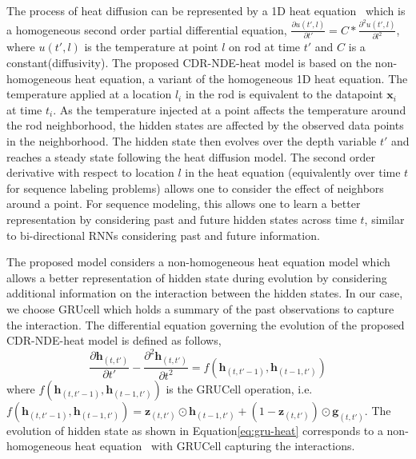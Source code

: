 \documentclass{article} %
\newcommand{\bx}{\mathbf{x}}
\newcommand{\bz}{\mathbf{z}}
\newcommand{\bg}{\mathbf{g}}
\newcommand{\bh}{\mathbf{h}}
\begin{document}
The process of heat diffusion can be represented by a 1D heat equation~\citep{cannon1984one} which is a homogeneous second order partial differential equation,
     $\frac{\partial u(t',l)}{\partial t'} = C* \frac{\partial^{2} u(t',l)}{\partial l^{2}}$,
where $u(t',l)$ is the temperature at point $l$ on rod at time $t'$ and $C$ is a constant(diffusivity). The proposed CDR-NDE-heat model is based on the non-homogeneous heat equation, a variant of the homogeneous 1D heat equation. The temperature applied at a location $l_i$ in the rod is equivalent to the datapoint $\bx_i$ at time $t_i$. As the temperature injected at a point affects the  temperature around the rod neighborhood, the hidden states are affected by the observed data points in the neighborhood.  The hidden state then evolves over the depth variable $t'$ and reaches a steady state following  the heat diffusion model. The second order derivative with respect to location $l$  in the heat equation (equivalently over time $t$ for sequence labeling problems) allows one to consider the effect of neighbors around a point. For sequence modeling, this allows one to learn a  better representation  by considering  past and future hidden states across time $t$, similar to bi-directional RNNs considering past and future information. 


The proposed model considers a non-homogeneous heat equation model which allows a better representation of hidden state during evolution by considering additional information on the interaction between the hidden states. In our case, we choose GRUcell which holds a summary of the past observations to capture the interaction.   The differential equation governing the evolution of the  proposed CDR-NDE-heat model is defined  as follows, 
\begin{equation}
     \frac{\partial \bh_{(t,t')}}{\partial t'} - \frac{\partial^{2} \bh_{(t,t')}}{\partial t^{2}} = f(\bh_{(t,t'-1)},\bh_{(t-1,t')}) 
     \label{eq:gru-heat}
\end{equation}
where $f(\bh_{(t,t'-1)},\bh_{(t-1,t')})$ is the  GRUCell  operation, i.e. $f(\bh_{(t,t'-1)},\bh_{(t-1,t')}) = \bz_{(t,t')} \odot \bh_{(t-1,t')}  + (1-\bz_{(t,t')})\odot\bg_{(t,t')}$. The evolution of hidden state as shown in Equation\ref{eq:gru-heat} corresponds to a  non-homogeneous heat equation~\citep{trong2005nonhomogeneous} with GRUCell capturing the interactions.%
\end{document}

